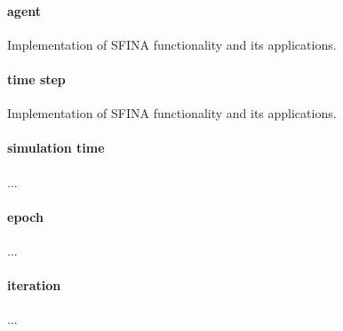 \documentclass[11pt,fleqn]{book} %
\begin{document}
\paragraph{agent}
Implementation of SFINA functionality and its applications.

\paragraph{time step}
Implementation of SFINA functionality and its applications.

\paragraph{simulation time}
...

\paragraph{epoch}
...

\paragraph{iteration}
...
\end{document}
